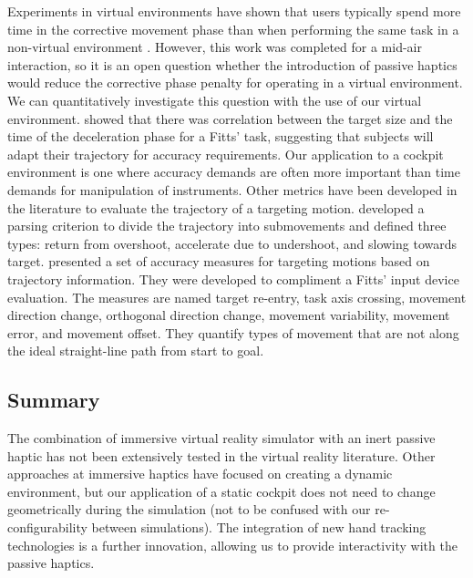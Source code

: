 Experiments in virtual environments have shown that users typically spend more time in the corrective movement phase than when performing the same task in a non-virtual environment \citep{liu_comparing_2009}.
However, this work was completed for a mid-air interaction, so it is an open question whether the introduction of passive haptics would reduce the corrective phase penalty for operating in a virtual environment.
We can quantitatively investigate this question with the use of our virtual environment.
\citet{mackenzie_three-dimensional_1987} showed that there was correlation between the target size and the time of the deceleration phase for a Fitts' task, suggesting that subjects will adapt their trajectory for accuracy requirements.
Our application to a cockpit environment is one where accuracy demands are often more important than time demands for manipulation of instruments.
%
%
Other metrics have been developed in the literature to evaluate the trajectory of a targeting motion.
\citet{meyer_optimality_1988} developed a parsing criterion to divide the trajectory into submovements and defined three types: return from overshoot, accelerate due to undershoot, and slowing towards target.
\citet{mackenzie_accuracy_2001} presented a set of accuracy measures for targeting motions based on trajectory information.
They were developed to compliment a Fitts' input device evaluation.
The measures are named target re-entry, task axis crossing, movement direction change, orthogonal direction change, movement variability, movement error, and movement offset.
They quantify types of movement that are not along the ideal straight-line path from start to goal.

\subsection{Summary}
\label{summary}

The combination of immersive virtual reality simulator with an inert passive haptic has not been extensively tested in the virtual reality literature.
Other approaches at immersive haptics have focused on creating a dynamic environment, but our application of a static cockpit does not need to change geometrically during the simulation (not to be confused with our re-configurability between simulations).
The integration of new hand tracking technologies is a further innovation, allowing us to provide interactivity with the passive haptics.

